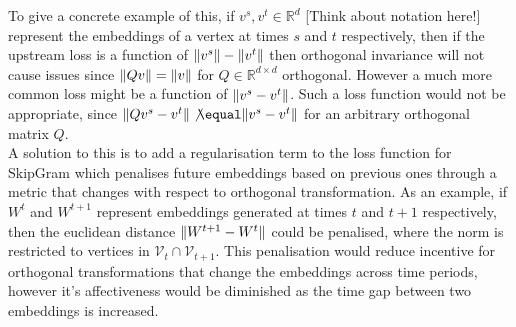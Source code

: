 \documentclass[a4paper]{article}
\renewcommand{\V}{\mathcal V}
\begin{document}
To give a concrete example of this,  if $v^s, v^t \in \mathbb{R}^d$ [Think about notation here!] represent the embeddings of a vertex at times $s$ and $t$ respectively, then
if the upstream loss is a function of $\lVert v^s\rVert-\lVert v^t\rVert$ then orthogonal invariance will not cause issues since $\lVert Qv\rVert = \lVert v\rVert$ for $Q \in \mathbb{R}^{d \times d}$ orthogonal.
However a much more common loss might be a function of $\lVert v^s - v^t\rVert$. Such a loss function would not be appropriate, since $\norm{Qv^s - v^t} \not\equal \norm{v^s - v^t}$ for an arbitrary
orthogonal matrix $Q$.\\
A solution to this is to add a regularisation term to the loss function for SkipGram which penalises future embeddings based on previous ones through a metric that changes with respect to orthogonal
transformation. As an example, if $W^t$ and $W^{t+1}$ represent embeddings generated at times $t$ and $t+1$ respectively, then the euclidean distance $\lVert W^{t+1} - W^t\rVert$ could be penalised,
where the norm is restricted to vertices in $\V_t \cap \V_{t+1}$. This penalisation would reduce incentive for orthogonal transformations that change the embeddings across time periods, however it's
affectiveness would be diminished as the time gap between two embeddings is increased.
\end{document}
